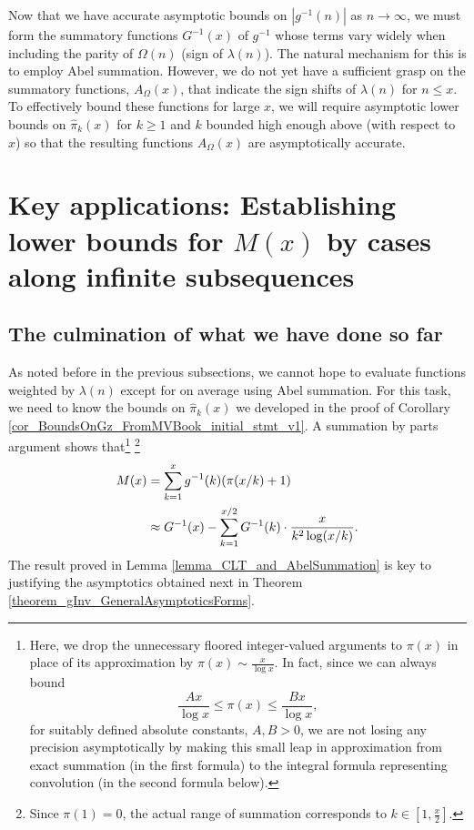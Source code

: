 \documentclass[11pt,reqno,a4letter]{article}
\numberwithin{figure}{section}
\numberwithin{table}{section}
\theoremstyle{plain}
\numberwithin{theorem}{section}
\theoremstyle{definition}
\begin{document}
Now that we have accurate asymptotic bounds on $|g^{-1}(n)|$ as $n \rightarrow \infty$, we must form the 
summatory functions $G^{-1}(x)$ of $g^{-1}$ whose terms vary widely when including the parity of 
$\Omega(n)$ (sign of $\lambda(n)$). The natural mechanism for this is to employ Abel summation. 
However, we do not yet have a sufficient grasp on the summatory functions, 
$A_{\Omega}(x)$, that indicate the sign shifts of $\lambda(n)$ for $n \leq x$. 
To effectively bound these functions for large $x$, we will require asymptotic lower bounds 
on $\widehat{\pi}_k(x)$ for $k \geq 1$ and $k$ bounded high enough above (with respect to $x$) so that 
the resulting functions $A_{\Omega}(x)$ are asymptotically accurate. 

\newpage
\section{Key applications: Establishing lower bounds for $M(x)$ by cases along infinite subsequences} 
\label{Section_KeyApplications} 

\subsection{The culmination of what we have done so far} 

As noted before in the previous subsections, we cannot hope to evaluate
functions weighted by $\lambda(n)$ except for on 
average using Abel summation. For this task, 
we need to know the bounds on $\widehat{\pi}_k(x)$ we developed in the 
proof of Corollary \ref{cor_BoundsOnGz_FromMVBook_initial_stmt_v1}. 
A summation by parts argument shows that\footnote{ 
     Here, we drop the unnecessary floored integer-valued arguments to $\pi(x)$ in place of 
     its approximation by $\pi(x) \sim \frac{x}{\log x}$. In fact, since we can always 
     bound $$\frac{Ax}{\log x} \leq \pi(x) \leq \frac{Bx}{\log x},$$ for suitably defined 
     absolute constants, $A,B > 0$, we are not losing any precision asymptotically by making 
     this small leap in approximation from exact summation (in the first formula) to the 
     integral formula representing convolution (in the second formula below). 
} \footnote{
     Since $\pi(1) = 0$, the actual range of summation corresponds to 
     $k \in \left[1, \frac{x}{2}\right]$. 
}
\begin{align} 
\notag
M(x) & = \sum_{k=1}^{x} g^{-1}(k) (\pi(x/k)+1) \\ 
\label{eqn_pf_tag_v2-restated_v2} 
     & \approx G^{-1}(x) - \sum_{k=1}^{x/2} G^{-1}(k) \cdot \frac{x}{k^2 \log(x/k)}. 
\end{align} 
The result proved in Lemma \ref{lemma_CLT_and_AbelSummation} is key to justifying the 
asymptotics obtained next in Theorem \ref{theorem_gInv_GeneralAsymptoticsForms}. 
\end{document}
